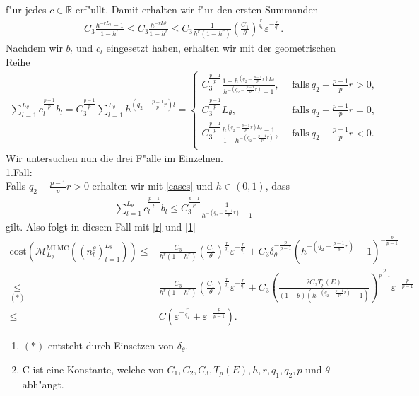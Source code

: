 f"ur jedes $c\in\mathbb{R}$ erf"ullt.
Damit erhalten wir f"ur den ersten Summanden
\begin{align}\label{1}
C_3\frac{h^{-rL_\theta}-1}{1-h^r}\leq C_3\frac{h^{-rL\theta}}{1-h^r}\leq C_3\frac{1}{h^r(1-h^r)}\left(\frac{C_1}{\theta}\right)^{\frac{r}{q_1}}\varepsilon^{-\frac{r}{q_1}}.
\end{align}
Nachdem wir $b_l$ und $c_l$ eingesetzt haben, erhalten wir mit der geometrischen Reihe
\begin{align}\label{cases}
\sum_{l=1}^{L_\theta}c_l^{\frac{p-1}{p}}b_l=C_3^{\frac{p-1}{p}}\sum_{l=1}^{L_\theta}h^{(q_2-\frac{p-1}{p}r)l}=\begin{cases} C_3^{\frac{p-1}{p}}\frac{1-h^{(q_2-\frac{p-1}{p}r)L_\theta}}{h^{-(q_2-\frac{p-1}{p}r)}-1}, \ \ &\text{falls} \ q_2-\frac{p-1}{p}r>0, \\
C_3^{\frac{p-1}{p}}L_\theta, &\text{falls} \ q_2-\frac{p-1}{p}r=0, \\
C_3^{\frac{p-1}{p}}\frac{h^{(q_2-\frac{p-1}{p}r)L_\theta}-1}{1-h^{-(q_2-\frac{p-1}{p}r)}}, \ \ &\text{falls} \ q_2-\frac{p-1}{p}r<0.\\
\end{cases}
\end{align}
Wir untersuchen nun die drei F"alle im Einzelnen.\\
\underline{1.Fall:}\\
Falls  $q_2-\frac{p-1}{p}r>0$ erhalten wir mit \eqref{cases} und $h\in(0,1)$, dass 
\begin{align*}
\sum_{l=1}^{L_\theta}c_l^{\frac{p-1}{p}}b_l\leq C_3^{\frac{p-1}{p}}\frac{1}{h^{-(q_2-\frac{p-1}{p}r)}-1}
\end{align*} gilt.
Also folgt in diesem Fall mit \eqref{r} und \eqref{1}
\begin{align*}
\text{cost}(\mathcal{M}_{L_\theta}^{\text{MLMC}}((n_l^\theta)_{l=1}^{L_\theta}))\leq& \frac{C_3}{h^r(1-h^r)}\left(\frac{C_1}{\theta}\right)^{\frac{r}{q_1}}\varepsilon^{-\frac{r}{q_1}}+C_3\delta_\theta^{-\frac{p}{p-1}}(h^{-(q_2-\frac{p-1}{p}r)}-1)^{-\frac{p}{p-1}}\\
\underset{(*)}{\leq}& \frac{C_3}{h^r(1-h^r)}\left(\frac{C_1}{\theta}\right)^{\frac{r}{q_1}}\varepsilon^{-\frac{r}{q_1}}+C_3\left(\frac{2C_2T_p(E)}{(1-\theta)(h^{-(q_2-\frac{p-1}{p}r)}-1)}\right)^{\frac{p}{p-1}}\varepsilon^{-\frac{p}{p-1}}\\
\leq& C\left(\varepsilon^{-\frac{r}{q_1}}+\varepsilon^{-\frac{p}{p-1}}\right).
\end{align*}
\begin{enumerate}
\item[-]$(*)$ entsteht durch Einsetzen von $\delta_\theta$.
\item[-]C ist eine Konstante, welche von $C_1,C_2,C_3,T_p(E),h,r,q_1,q_2,p$ und $\theta$ abh"angt.
\end{enumerate}
